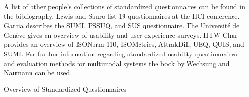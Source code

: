 	A list of other people's collections of standardized questionnaires can be found in the bibliography. Lewis and Sauro \cite{Lewis2013HCI} list 19 questionnaires at the HCI conference. Garcia \cite{Garcia2013UXResearch} describes the SUMI, PSSUQ, and SUS questionnaire. The Universit{\'e} de Gen{\`e}ve \cite{Geneve2014Wiki} gives an overview of usability and user experience surveys. HTW Chur \cite{Chur2014Questionnaires} provides an overview of ISONorm 110, ISOMetrics, AttrakDiff, UEQ, QUIS, and SUMI. For further information regarding standardized usability questionnaires and evaluation methods for multimodal systems the book by Wechsung and Naumann \cite{wechsung2008evaluation} can be used. 



		\begin{table}[p]
			\small
			\center
			\begin{adjustwidth}{-1.5cm}{}
			    
			    \caption[Standardized Questionnaires]{Overview of Standardized Questionnaires}
			\label{table:standardized-questionnaires}
			            \end{adjustwidth}

		\end{table}


	

\clearpage



